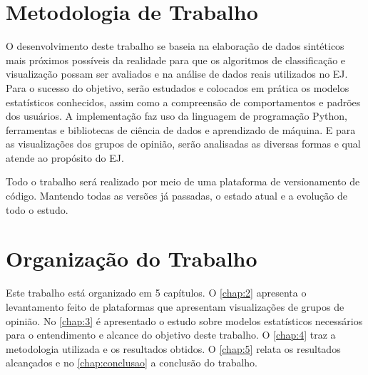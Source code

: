 \section{Metodologia de Trabalho}



O desenvolvimento deste trabalho se baseia na elaboração de dados sintéticos mais próximos possíveis da realidade para que os algoritmos de classificação e visualização possam ser avaliados e na análise de dados reais utilizados no EJ. Para o sucesso do objetivo, serão estudados e colocados em prática os modelos estatísticos conhecidos, assim como a compreensão de comportamentos e padrões dos usuários. A implementação faz uso da linguagem de programação Python, ferramentas e bibliotecas de ciência de dados e aprendizado de máquina. E para as visualizações dos grupos de opinião, serão analisadas as diversas formas e qual atende ao propósito do EJ. 

Todo o trabalho será realizado por meio de uma plataforma de versionamento de código. Mantendo todas as versões já passadas, o estado atual e a evolução de todo o estudo.

\section{Organização do Trabalho}

Este trabalho está organizado em 5 capítulos. O \autoref{chap:2} apresenta o levantamento feito de plataformas que apresentam visualizações de grupos de opinião. No \autoref{chap:3} é apresentado o estudo sobre modelos estatísticos necessários para o entendimento e alcance do objetivo deste trabalho. O \autoref{chap:4} traz a metodologia utilizada e os resultados obtidos. O \autoref{chap:5} relata os resultados alcançados e no \autoref{chap:conclusao} a conclusão do trabalho.

